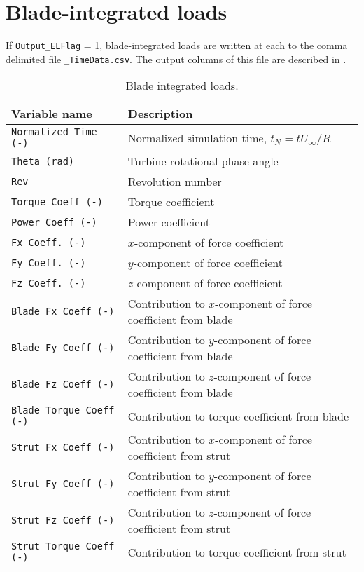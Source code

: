 \section{Blade-integrated loads}
If \texttt{Output\_ELFlag} = 1, blade-integrated loads are written at each to the comma delimited file \texttt{\_TimeData.csv}. The output columns of this file are described in .

\begin{table}[!htbp]
\centering
\caption{Blade integrated loads.}
\label{tbl:output_vars_time}
\begin{tabular}{p{}p{}}
\toprule
Variable name & Description \\ \midrule
\texttt{Normalized Time (-)}      & Normalized simulation time, $t_N=t U_\infty/R$ \\
\texttt{Theta (rad)}              & Turbine rotational phase angle \\
\texttt{Rev}                      & Revolution number \\
\texttt{Torque Coeff (-)}         & Torque coefficient \\
\texttt{Power Coeff (-)}          & Power coefficient \\
\texttt{Fx Coeff. (-)}            & $x$-component of force coefficient \\
\texttt{Fy Coeff. (-)}            & $y$-component of force coefficient \\
\texttt{Fz Coeff. (-)}            & $z$-component of force coefficient \\
\texttt{Blade Fx Coeff (-)}       & Contribution to $x$-component of force coefficient from blade \\
\texttt{Blade Fy Coeff (-)}       & Contribution to $y$-component of force coefficient from blade \\
\texttt{Blade Fz Coeff (-)}       & Contribution to $z$-component of force coefficient from blade \\
\texttt{Blade Torque Coeff (-)}   & Contribution to torque coefficient from blade \\
\texttt{Strut Fx Coeff (-)}       & Contribution to $x$-component of force coefficient from strut \\
\texttt{Strut Fy Coeff (-)}       & Contribution to $y$-component of force coefficient from strut \\
\texttt{Strut Fz Coeff (-)}       & Contribution to $z$-component of force coefficient from strut \\
\texttt{Strut Torque Coeff (-)}   & Contribution to torque coefficient from strut \\
\bottomrule
\end{tabular}
\end{table}

